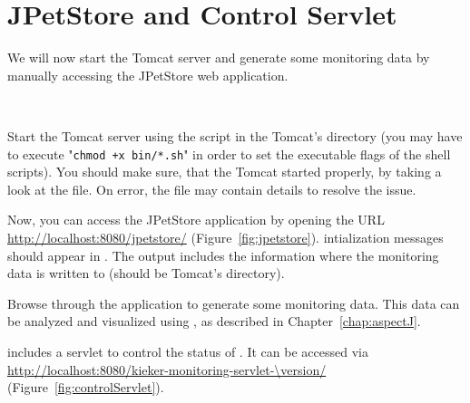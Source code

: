\section{JPetStore and \KiekerMonitoringPart{} Control Servlet}

\noindent We will now start the Tomcat server and generate some monitoring data by manually %
accessing the JPetStore web application. 

\

\enlargethispage{1.5cm}

\begin{compactenum}
\item Start the Tomcat server using the  script in the 
   Tomcat's  directory (you may have to execute "\texttt{chmod +x bin/*.sh}" %
   in order to set the executable flags of the shell scripts). %
   You should make sure, that the Tomcat started properly, by taking 
   a look at the  file. %
   On error, the file  may contain details %
   to resolve the issue.
\item Now, you can access the JPetStore application by opening the URL
   \url{http://localhost:8080/jpetstore/} (Figure~\ref{fig:jpetstore}). %
   \Kieker{} intialization messages should appear in . %
   The output includes the information where the monitoring data is written to
   (should be Tomcat's  directory).
\item  Browse through the application to generate some monitoring data. %
   This data can be analyzed and visualized using \KiekerTraceAnalysis{}, %
   as described in Chapter~\ref{chap:aspectJ}.
\item \Kieker{} includes a servlet to control the status of \KiekerMonitoringPart{}. %
   It can be accessed via \url{http://localhost:8080/kieker-monitoring-servlet-\version/} %
   (Figure~\ref{fig:controlServlet}).
\end{compactenum}

